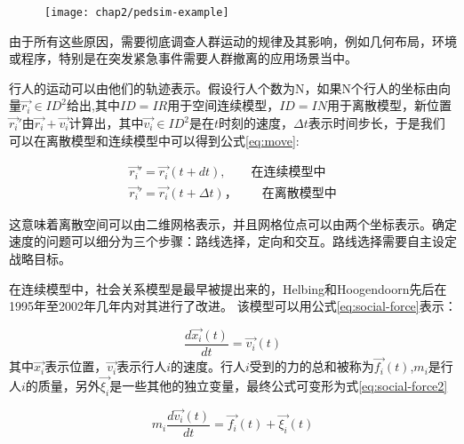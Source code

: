 \begin{figure}[!htp]
    \centering
    \texttt{[image: chap2/pedsim-example]}
\end{figure}

由于所有这些原因，需要彻底调查人群运动的规律及其影响，例如几何布局，环境或程序，特别是在突发紧急事件需要人群撤离的应用场景当中。

行人的运动可以由他们的轨迹表示。假设行人个数为N，如果N个行人的坐标由向量$\overrightarrow{r_{i}}\in ID^{2}$给出,其中$ID = IR$用于空间连续模型，$ID = IN$用于离散模型，新位置$\overrightarrow{r_{i}}'$由$\overrightarrow{r_{i}}+\overrightarrow{v_{i}}$计算出，其中$\overrightarrow{v_{i}}\in ID^{2}$是在$t$时刻的速度，$\Delta t$表示时间步长，于是我们可以在离散模型和连续模型中可以得到公式\ref{eq:move}:

{\setlength\abovedisplayskip{15pt}
\setlength\belowdisplayskip{15pt}
\begin{eqnarray}
    \label{eq:move}
    \overrightarrow{r_{i}}'=\overrightarrow{r_{i}}(t+dt), \qquad \text{在连续模型中} \\
    \overrightarrow{r_{i}}'=\overrightarrow{r_{i}}(t+\Delta t)，\qquad \nonumber \text{在离散模型中} 
\end{eqnarray}}

这意味着离散空间可以由二维网格表示，并且网格位点可以由两个坐标表示。确定速度的问题可以细分为三个步骤：路线选择，定向和交互。路线选择需要自主设定战略目标。

在连续模型中，社会关系模型是最早被提出来的，Helbing\cite{helbing2001self}和Hoogendoorn\cite{hoogendoorn2000gas}\cite{hoogendoorn2002microscopic}先后在1995年至2002年几年内对其进行了改进。
该模型可以用公式\ref{eq:social-force}表示：

{\setlength\abovedisplayskip{15pt}
\setlength\belowdisplayskip{15pt}
\begin{equation}
    \label{eq:social-force}
    \frac{d\overrightarrow{x_{i}}(t)}{dt}=\overrightarrow{v_{i}}(t)
\end{equation}}
其中$\overrightarrow{x_{i}}$表示位置，$\overrightarrow{v_{i}}$表示行人$i$的速度。行人$i$受到的力的总和被称为$\overrightarrow{f_{i}}(t)$,$m_{i}$是行人$i$的质量，另外$\overrightarrow{\xi_{i}}$是一些其他的独立变量，最终公式可变形为式\ref{eq:social-force2}

{\setlength\abovedisplayskip{15pt}
\setlength\belowdisplayskip{15pt}
\begin{equation}
    \label{eq:social-force2}
    m_{i}\frac{d\overrightarrow{v_{i}}(t)}{dt}=\overrightarrow{f_{i}}(t)+\overrightarrow{\xi_{i}}(t)
\end{equation}}

